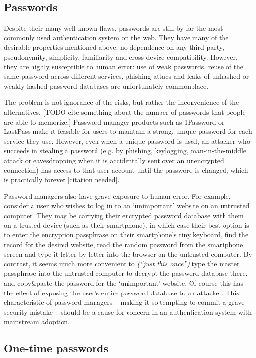 \subsection{Passwords}

Despite their many well-known flaws, passwords are still by far the most commonly used
authentication system on the web. They have many of the desirable properties mentioned above: no
dependence on any third party, pseudonymity, simplicity, familiarity and cross-device compatibility.
However, they are highly susceptible to human error: use of weak passwords, reuse of the same
password across different services, phishing attacs and leaks of unhashed or weakly hashed password
databases are unfortunately commonplace.

The problem is not ignorance of the risks, but rather the inconvenience of the alternatives.
[TODO cite something about the number of passwords that people are able to memorize.]
Password manager products such as 1Password or LastPass make it feasible for users to maintain a
strong, unique password for each service they use. However, even when a unique password is used, an
attacker who succeeds in stealing a password (e.g. by phishing, keylogging, man-in-the-middle attack
or eavesdropping when it is accidentally sent over an unencrypted connection) has access to that
user account until the password is changed, which is practically forever [citation needed].

Password managers also have grave exposure to human error. For example, consider a user who wishes
to log in to an `unimportant' website on an untrusted computer. They may be carrying their encrypted
password database with them on a trusted device (such as their smartphone), in which case their best
option is to enter the encryption passphrase on their smartphone's tiny keyboard, find the record
for the desired website, read the random password from the smartphone screen and type it letter by
letter into the browser on the untrusted computer. By contrast, it seems much more convenient to
\emph{(``just this once'')} type the master passphrase into the untrusted computer to decrypt the
password database there, and copy\&paste the password for the `unimportant' website. Of course this
has the effect of exposing the user's entire password database to an attacker. This characteristic
of password managers -- making it so tempting to commit a grave security mistake -- should be a
cause for concern in an authentication system with mainstream adoption.

\subsection{One-time passwords}

